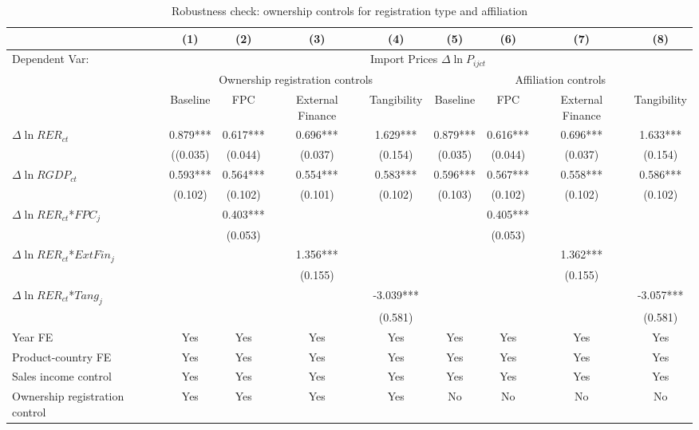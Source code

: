 \begin{table}
	\centering
	\caption{Robustness check: ownership controls for registration type and affiliation}
	\begin{threeparttable}
		\begin{tabular}{lcccccccc}
			\toprule
			& (1)   & (2)   & (3)   & (4) &  (5)  &  (6)  & (7)  & (8)\\
			\midrule
                Dependent Var: & \multicolumn{8}{c}{ Import Prices $\Delta \ln P_{ijct}$} \\
			& \multicolumn{4}{c}{Ownership registration controls} & \multicolumn{4}{c}{Affiliation controls}\\
			& Baseline & FPC   & External Finance & Tangibility & Baseline & FPC & External Finance & Tangibility\\
			\midrule
			$\Delta \ln RER_{ct}$ & 0.879*** & 0.617*** & 0.696*** & 1.629*** & 0.879*** & 0.616*** & 0.696*** & 1.633*** \\
			& ((0.035) & (0.044) & (0.037) & (0.154) & (0.035) & (0.044) & (0.037) & (0.154) \\
			$\Delta \ln RGDP_{ct}$ & 0.593*** & 0.564*** & 0.554*** & 0.583*** & 0.596*** & 0.567*** & 0.558*** & 0.586*** \\
			& (0.102) & (0.102) & (0.101) & (0.102) & (0.103) & (0.102) & (0.102) & (0.102) \\
			$\Delta \ln RER_{ct}$*$FPC_{j}$ &    & 0.403*** &       &       &       & 0.405*** &       &  \\
			&  & (0.053) &       &       &       & (0.053) &       &  \\
			$\Delta \ln RER_{ct}$*$ExtFin_{j}$ &    &       & 1.356*** &       &       &       & 1.362*** &  \\
			&   &       & (0.155) &       &       &       & (0.155) &  \\
			$\Delta \ln RER_{ct}$*$Tang_{j}$ &     &       &       & -3.039*** &       &       &       & -3.057*** \\
			&   &       &       & (0.581) &       &       &       & (0.581) \\
                \midrule
			Year FE  &  Yes   & Yes   & Yes   & Yes & Yes   & Yes   & Yes   & Yes\\
			Product-country FE &  Yes   & Yes   & Yes   & Yes & Yes   & Yes   & Yes   & Yes\\
			Sales income control &  Yes   & Yes   & Yes   & Yes & Yes   & Yes   & Yes   & Yes\\
			Ownership registration control &  Yes   & Yes & Yes  & Yes & No & No & No & No\\

\end{tabular}
\end{threeparttable}
\end{table}
